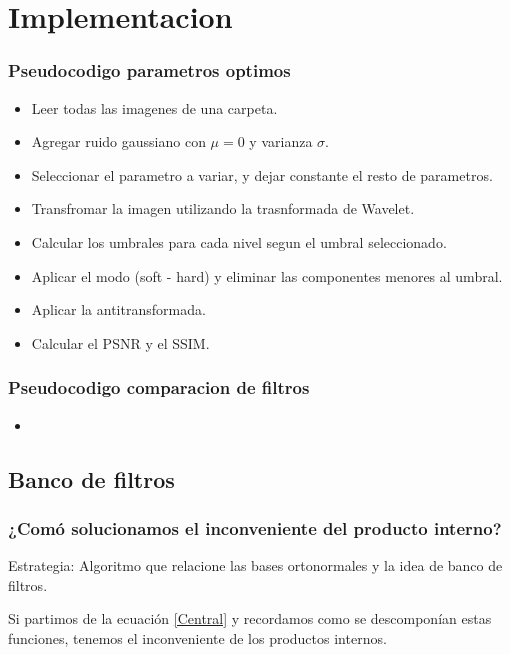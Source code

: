 \documentclass{beamer}
\begin{document}
  \section{Implementacion}

  \begin{frame}
    \frametitle{Pseudocodigo parametros optimos}
  
    \begin{itemize}
      \item Leer todas las imagenes de una carpeta.
      \item Agregar ruido gaussiano con $\mu=0$ y varianza $\sigma$.
      \item Seleccionar el parametro a variar, y dejar constante el resto de parametros.
      \item Transfromar la imagen utilizando la trasnformada de Wavelet.
      \item Calcular los umbrales para cada nivel segun el umbral seleccionado.
      \item Aplicar el modo (soft - hard) y eliminar las componentes menores al umbral.
      \item Aplicar la antitransformada.
      \item Calcular el PSNR y el SSIM.
    \end{itemize}
  
  \end{frame}

  \begin{frame}
    \frametitle{Pseudocodigo comparacion de filtros}
    \begin{itemize}
      \item 
    \end{itemize}
    
  
  \end{frame}

  \subsection{Banco de filtros}
  
  \begin{frame}
    \frametitle{¿Comó solucionamos el inconveniente del producto interno?}
    
    Estrategia: Algoritmo que relacione las bases ortonormales y la idea de banco de filtros.
      
     Si partimos de la ecuación \ref{Central} y recordamos como se descomponían estas funciones, tenemos el inconveniente de los productos internos.
        
  \end{frame}
\end{document}
